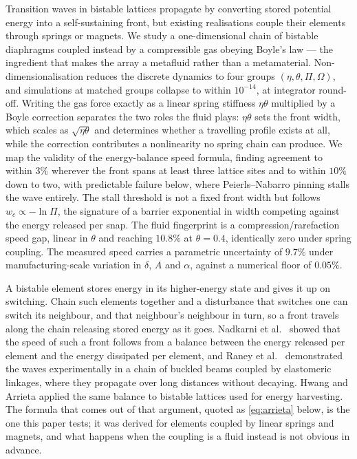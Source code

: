 Transition waves in bistable lattices propagate by converting stored potential
energy into a self-sustaining front, but existing realisations couple their
elements through springs or magnets. We study a one-dimensional chain of bistable
diaphragms coupled instead by a compressible gas obeying Boyle's law --- the
ingredient that makes the array a metafluid rather than a metamaterial.
Non-dimensionalisation reduces the discrete dynamics to four groups
$(\eta,\theta,\Pi,\Omega)$, and simulations at matched groups collapse to within
$10^{-14}$, at integrator round-off. Writing the gas force exactly as a linear
spring stiffness $\eta\theta$ multiplied by a Boyle correction separates the two
roles the fluid plays: $\eta\theta$ sets the front width, which scales as
$\sqrt{\eta\theta}$ and determines whether a travelling profile exists at all,
while the correction contributes a nonlinearity no spring chain can produce. We
map the validity of the energy-balance speed formula, finding agreement to within
$3\%$ wherever the front spans at least three lattice sites and to within $10\%$
down to two, with predictable failure below, where Peierls--Nabarro pinning stalls
the wave entirely. The stall threshold is not a fixed front width but follows
$w_c \propto -\ln\Pi$, the signature of a barrier exponential in width competing
against the energy released per snap. The fluid fingerprint is a
compression/rarefaction speed gap, linear in $\theta$ and reaching $10.8\%$ at
$\theta = 0.4$, identically zero under spring coupling. The measured speed carries
a parametric uncertainty of $9.7\%$ under manufacturing-scale variation in
$\delta$, $A$ and $\alpha$, against a numerical floor of $0.05\%$.



A bistable element stores energy in its higher-energy state and gives it up on
switching. Chain such elements together and a disturbance that switches one can
switch its neighbour, and that neighbour's neighbour in turn, so a front travels
along the chain releasing stored energy as it goes. Nadkarni et al.\
\cite{nadkarni2014dynamics,nadkarni2016universal} showed that the speed of such a
front follows from a balance between the energy released per element and the
energy dissipated per element, and Raney et al.\ \cite{raney2016stable}
demonstrated the waves experimentally in a chain of buckled beams coupled by
elastomeric linkages, where they propagate over long distances without decaying.
Hwang and Arrieta \cite{hwang2018input} applied the same balance to bistable
lattices used for energy harvesting. The formula that comes out of that argument,
quoted as \eqref{eq:arrieta} below, is the one this paper tests; it was derived
for elements coupled by linear springs and magnets, and what happens when the
coupling is a fluid instead is not obvious in advance.


